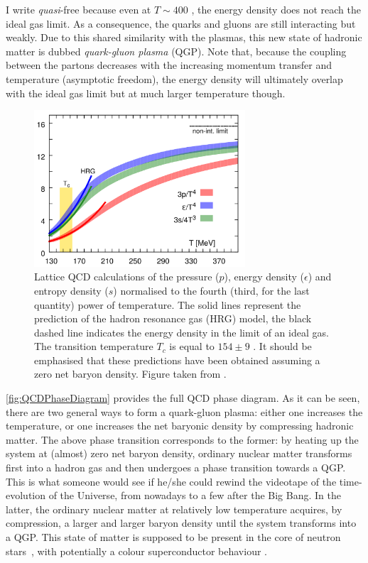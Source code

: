 I write \textit{quasi}-free because even at $T \sim 400 $ \mev, the energy density does not reach the ideal gas limit. As a consequence, the quarks and gluons are still interacting but weakly. Due to this shared similarity with the plasmas, this new state of hadronic matter is dubbed \textit{quark-gluon plasma} (QGP). Note that, because the coupling between the partons decreases with the increasing momentum transfer and temperature (asymptotic freedom), the energy density will ultimately overlap with the ideal gas limit but at much larger temperature though. \\

\begin{figure}[!p]
	\centering
	\includegraphics[width=0.7\textwidth]{Figs/Chapter2/Pressure_energy_entropy.png}
	\caption{Lattice QCD calculations of the pressure ($p$), energy density ($\epsilon$) and entropy density ($s$) normalised to the fourth (third, for the last quantity) power of temperature. The solid lines represent the prediction of the hadron resonance gas (HRG) model, the black dashed line indicates the energy density in the limit of an ideal gas. The transition temperature $T_{c}$ is equal to $154 \pm 9$ \mev. It should be emphasised that these predictions have been obtained assuming a zero net baryon density. Figure taken from \cite{bazavovEquationStateFlavor2014}.}
	\label{fig:QCDEnergyDensity}
\end{figure}

\Fig\ref{fig:QCDPhaseDiagram} provides the full QCD phase diagram. As it can be seen, there are two general ways to form a quark-gluon plasma: either one increases the temperature, or one increases the net baryonic density by compressing hadronic matter. The above phase transition corresponds to the former: by heating up the system at (almost) zero net baryon density, ordinary nuclear matter transforms first into a hadron gas and then undergoes a phase transition towards a QGP. This is what someone would see if he/she could rewind the videotape of the time-evolution of the Universe, from nowadays to a few \musec after the Big Bang. In the latter, the ordinary nuclear matter at relatively low temperature acquires, by compression, a larger and larger baryon density until the system transforms into a QGP. This state of matter is supposed to be present in the core of neutron stars~\cite{annalaEvidenceQuarkmatterCores2020}, with potentially a colour superconductor behaviour \cite{alfordQCDFiniteBaryon1998}.

